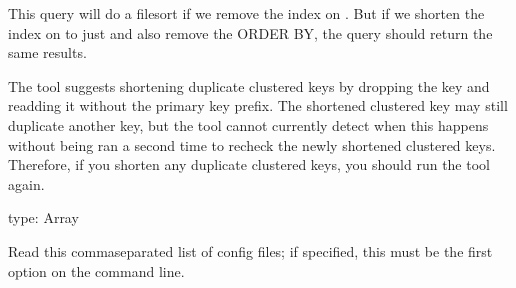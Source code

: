 \documentclass[letterpaper,10pt,english]{sphinxmanual}
\begin{document}
\begin{fulllineitems}
\sphinxAtStartPar
This query will do a filesort if we remove the index on .  But if we
shorten the index on  to just  and also remove the ORDER BY, the query
should return the same results.

\sphinxAtStartPar
The tool suggests shortening duplicate clustered keys by dropping the key
and re\sphinxhyphen{}adding it without the primary key prefix.  The shortened clustered
key may still duplicate another key, but the tool cannot currently detect
when this happens without being ran a second time to re\sphinxhyphen{}check the newly
shortened clustered keys.  Therefore, if you shorten any duplicate clustered
keys, you should run the tool again.

\end{fulllineitems}


\begin{fulllineitems}
\label{\detokenize{mariadb-index-checker:cmdoption-mariadb-index-checker-config}}
\sphinxAtStartPar
type: Array

\sphinxAtStartPar
Read this comma\sphinxhyphen{}separated list of config files; if specified, this must be the
first option on the command line.

\end{fulllineitems}

\end{document}
